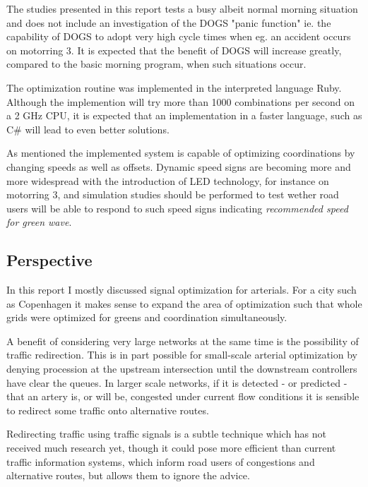 The studies presented in this report tests a busy albeit normal morning situation and does not include an investigation of the DOGS "panic function" ie. the capability of DOGS to adopt very high cycle times when eg. an accident occurs on motorring 3. It is expected that the benefit of DOGS will increase greatly, compared to the basic morning program, when such situations occur.

The optimization routine was implemented in the interpreted language Ruby. Although the implemention will try more than 1000 combinations per second on a 2 GHz CPU, it is expected that an implementation in a faster language, such as C\# will lead to even better solutions.

As mentioned the implemented system is capable of optimizing coordinations by changing speeds as well as offsets. Dynamic speed signs are becoming more and more widespread with the introduction of LED technology, for instance on motorring 3, and simulation studies should be performed to test wether road users will be able to respond to such speed signs indicating \textit{recommended speed for green wave}.

\subsection{Perspective}
In this report I mostly discussed signal optimization for arterials. For a city such as Copenhagen it makes sense to expand the area of optimization such that whole grids were optimized for greens and coordination simultaneously.

A benefit of considering very large networks at the same time is the possibility of traffic redirection. This is in part possible for small-scale arterial optimization by denying procession at the upstream intersection until the downstream controllers have clear the queues. In larger scale networks, if it is detected - or predicted - that an artery is, or will be, congested under current flow conditions it is sensible to redirect some traffic onto alternative routes. 

Redirecting traffic using traffic signals is a subtle technique which has not received much research yet, though it could pose more efficient than current traffic information systems, which inform road users of congestions and alternative routes, but allows them to ignore the advice.
